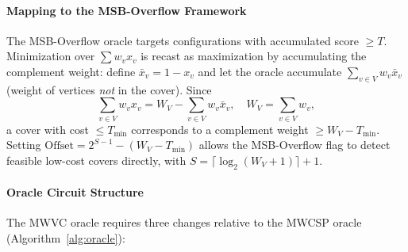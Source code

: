 \documentclass{ieeeaccess}
\begin{document}
\paragraph{Mapping to the MSB-Overflow Framework}

The MSB-Overflow oracle targets configurations with accumulated
score $\geq T$. Minimization over $\sum w_v x_v$ is recast as
maximization by accumulating the complement weight: define
$\bar{x}_v = 1 - x_v$ and let the oracle accumulate
$\sum_{v \in V} w_v \bar{x}_v$ (weight of vertices \emph{not} in
the cover). Since
%
\begin{equation}
  \sum_{v \in V} w_v x_v
  = W_V - \sum_{v \in V} w_v \bar{x}_v,
  \quad W_V = \sum_{v \in V} w_v,
\end{equation}
%
a cover with cost $\leq T_{\min}$ corresponds to a complement
weight $\geq W_V - T_{\min}$. Setting
$\mathrm{Offset} = 2^{S-1} - (W_V - T_{\min})$ allows the
MSB-Overflow flag to detect feasible low-cost covers directly,
with $S = \lceil \log_2(W_V + 1) \rceil + 1$.

\paragraph{Oracle Circuit Structure}

The MWVC oracle requires three changes relative to the MWCSP
oracle (Algorithm~\ref{alg:oracle}):
\end{document}
